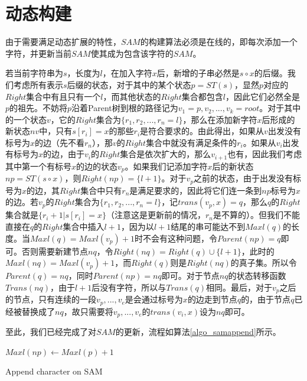 ﻿\documentclass{sysuthesis}
\begin{document}
\section{动态构建}
由于需要满足动态扩展的特性，$SAM$的构建算法必须是在线的，即每次添加一个字符，并更新当前$SAM$使其成为包含该字符的$SAM$。\par
若当前字符串为$s$，长度为$l$，在加入字符$x$后，新增的子串必然是$s \circ x$的后缀。我们考虑所有表示$s$后缀的状态，对于其中的某个状态$p = ST(s)$，显然$p$对应的$Right$集合中有且只有一个$l$，而其他状态的$Right$集合都包含$l$，因此它们必然全是$p$的祖先。不妨将$p$沿着Parent树到根的路径记为$v_{1} = p, v_{2}, ... , v_{k} = root$。对于其中的一个状态$v$，它的$Right$集合为$\{r_{1}, r_{2}, ..., r_{n} = l\}$，那么在添加新字符$x$后形成的新状态$nv$中，只有$s[r_{i}] = x$的那些$r_{i}$是符合要求的。由此得出，如果从$v$出发没有标号为$x$的边（先不看$r_{n}$），那$v$的$Right$集合中就没有满足条件的$r_{i}$。如果从$v_{i}$出发有标号为$x$的边，由于$v_{i}$的$Right$集合是依次扩大的，那么$v_{i+1}$也有，因此我们考虑其中第一个有标号$x$的边的状态$v_{p}$。如果我们记添加字符$x$后的新状态$np = ST(s \circ x)$，则$Right(np) = \{l + 1\}$。对于$v_{p}$之前的状态，由于出发没有标号为$x$的边，其$Right$集合中只有$r_{n}$是满足要求的，因此将它们连一条到$np$标号为$x$的边。若$v_{p}$的$Right$集合为$\{r_{1}, r_{2}, ..., r_{n} = l\}$，记$trans(v_{p}, x) = q$，那么$q$的$Right$集合就是$\{r_{i} + 1 | s[r_{i}] = x\}$（注意这是更新前的情况，$r_{n}$是不算的）。但我们不能直接在$q$的$Right$集合中插入$l + 1$，因为以$l + 1$结尾的串可能达不到$Maxl(q)$的长度。当$Maxl(q) = Maxl(v_{p}) + 1$时不会有这种问题，令$Parent(np) = q$即可。否则需要新建节点$nq$，令$Right(nq) = Right(q) \cup \{l + 1\}$，此时的$Maxl(nq) = Maxl(v_{p}) + 1$，而$Right(q)$则是$Right(nq)$的真子集。所以令$Parent(q) = nq$，同时$Parent(np) = nq$即可。对于节点$nq$的状态转移函数$Trans(nq)$，由于$l + 1$后没有字符，所以与$Trans(q)$相同。最后，对于$v_{p}$之后的节点，只有连续的一段$v_{p}, ..., v_{e}$是会通过标号为$x$的边走到节点$q$的，由于节点$q$已经被替换成了$nq$，故只需要将$v_{p}, ..., v_{e}$的$trans(v_{i}, x)$设为$nq$即可。\par
至此，我们已经完成了对$SAM$的更新，流程如算法\ref{algo_samappend}所示。\par

\begin{algorithm}[H]
	$Maxl(np) \leftarrow Maxl(p) + 1$\;
	\caption{Append character on SAM}\label{algo_samappend}
\end{algorithm}
\end{document}
